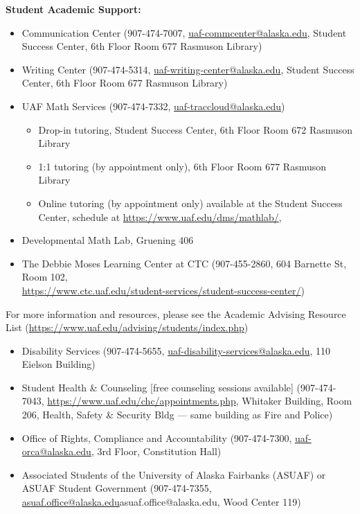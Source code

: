 \documentclass[11pt]{article}
\renewcommand{\emph}[1]{\textsf{\textbf{#1}}}
\def\mailto#1{\href{mailto:#1}{#1}}
\begin{document}
\noindent\emph{Student Academic Support:}
\begin{itemize}
\setlength\itemsep{0em}
        \item Communication Center (907-474-7007, \mailto{uaf-commcenter@alaska.edu}, Student Success Center, 6th Floor Room 677 Rasmuson Library)
        \item Writing Center (907-474-5314, \mailto{uaf-writing-center@alaska.edu}, Student Success Center, 6th Floor Room 677 Rasmuson Library)
\item UAF Math Services (907-474-7332, \mailto{uaf-traccloud@alaska.edu})


\begin{itemize}
\item Drop-in tutoring, Student Success Center, 6th Floor Room 672 Rasmuson Library

\item 1:1 tutoring (by appointment only), 6th Floor Room 677 Rasmuson Library

\item Online tutoring (by appointment only)
available at the Student Success Center, schedule at \url{https://www.uaf.edu/dms/mathlab/}, 
\end{itemize}

\item Developmental Math Lab, Gruening 406
\item The Debbie Moses Learning Center at CTC (907-455-2860, 604 Barnette St, Room 102,\\ \url{https://www.ctc.uaf.edu/student-services/student-success-center/})
\end{itemize}

 For more information and resources, please see the Academic Advising Resource List (\url{https://www.uaf.edu/advising/students/index.php})


\begin{itemize}
\setlength\itemsep{0em}
\item Disability Services (907-474-5655, \mailto{uaf-disability-services@alaska.edu}, 110 Eielson Building)
\item Student Health \& Counseling [free counseling sessions available] (907-474-7043, \url{https://www.uaf.edu/chc/appointments.php}, Whitaker Building, Room 206, Health, Safety \& Security Bldg --- same building as Fire and Police)
\item Office of Rights, Compliance and Accountability (907-474-7300, \mailto{uaf-orca@alaska.edu}, 3rd Floor, Constitution Hall)
\item Associated Students of the University of Alaska Fairbanks (ASUAF) or ASUAF Student Government (907-474-7355, \mailto{asuaf.office@alaska.edu}{asuaf.office@alaska.edu}, Wood Center 119)
\end{itemize}
\end{document}
